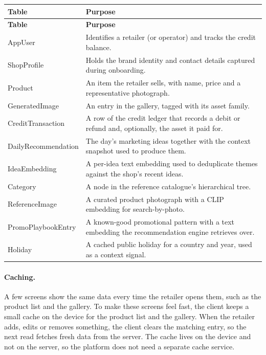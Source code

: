 {\footnotesize
\renewcommand{\arraystretch}{1.1}
\begin{tabularx}{\textwidth}{|>{\raggedright\arraybackslash}p{4.5cm}|Y|}
\caption{Purpose of each table in the schema.}\label{tab:schema-tables}\\
\hline
\textbf{Table} & \textbf{Purpose} \\
\hline
\endfirsthead
\hline
\textbf{Table} & \textbf{Purpose} \\
\hline
\endhead
\hline
\endfoot
\hline
\endlastfoot
AppUser & Identifies a retailer (or operator) and tracks the credit balance. \\
\hline
ShopProfile & Holds the brand identity and contact details captured during onboarding. \\
\hline
Product & An item the retailer sells, with name, price and a representative photograph. \\
\hline
GeneratedImage & An entry in the gallery, tagged with its asset family. \\
\hline
CreditTransaction & A row of the credit ledger that records a debit or refund and, optionally, the asset it paid for. \\
\hline
DailyRecommendation & The day's marketing ideas together with the context snapshot used to produce them. \\
\hline
IdeaEmbedding & A per-idea text embedding used to deduplicate themes against the shop's recent ideas. \\
\hline\hline
Category & A node in the reference catalogue's hierarchical tree. \\
\hline
ReferenceImage & A curated product photograph with a CLIP embedding for search-by-photo. \\
\hline
PromoPlaybookEntry & A known-good promotional pattern with a text embedding the recommendation engine retrieves over. \\
\hline
Holiday & A cached public holiday for a country and year, used as a context signal. \\
\end{tabularx}
}

\paragraph{Caching.}\label{subsec:caching}
A few screens show the same data every time the retailer opens them, such as the product list and the gallery. To make these screens feel fast, the client keeps a small cache on the device for the product list and the gallery. When the retailer adds, edits or removes something, the client clears the matching entry, so the next read fetches fresh data from the server. The cache lives on the device and not on the server, so the platform does not need a separate cache service.

